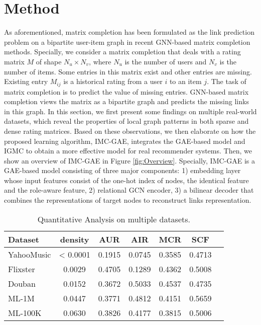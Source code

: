 \documentclass[sigconf]{acmart}
\begin{document}
\section{Method}
As aforementioned, matrix completion has been formulated as the link prediction problem on a bipartite user-item graph in recent GNN-based matrix completion methods. 
Specially, we consider a matrix completion that deals with a rating matrix $M$ of shape $N_u \times N_v$, where $N_u$ is the number of users and $N_v$ is the number of items. Some entries in this matrix exist and other entries are missing. Existing entry $M_{ij}$ is a historical rating from a user $i$ to an item $j$. 
The task of matrix completion is to predict the value of missing entries. 
GNN-based matrix completion views the matrix as a bipartite graph and predicts the missing links in this graph.
In this section, we first present some findings on multiple real-world datasets, which reveal the properties of local graph patterns in both sparse and dense rating matrices. 
Based on these observations, we then elaborate on how the proposed learning algorithm, IMC-GAE, integrates the GAE-based model and IGMC to obtain a more effective model for real recommender systems. Then, we show an overview of IMC-GAE in Figure \ref{fig:Overview}. Specially, IMC-GAE is a GAE-based model consisting of three major components:  1) embedding layer whose input features consist of the one-hot index of nodes, the identical feature and the role-aware feature, 2) relational GCN encoder, 3) a bilinear decoder that combines the representations of target nodes to reconstruct links representation. 
\begin{table}
  \caption{Quantitative Analysis on multiple datasets.}
  \label{tab:QAD}
  \begin{tabular}{lcccccc}
    \toprule
    \textbf{Dataset} & \textbf{density} &\textbf{AUR}&\textbf{AIR}&\textbf{MCR}&\textbf{SCF} \\
    \midrule
    YahooMusic & < 0.0001 & 0.1915 & 0.0745 & 0.3585 & 0.4713\\
    Flixster & 0.0029 & 0.4705 & 0.1289 & 0.4362 & 0.5008\\
    Douban & 0.0152 & 0.3672 & 0.5033 & 0.4537 &  0.4735\\
    ML-1M & 0.0447 & 0.3771 & 0.4812 & 0.4151 &  0.5659\\
    ML-100K & 0.0630 & 0.3826 & 0.4177 & 0.3815 & 0.5006\\
  \bottomrule
\end{tabular}
\end{table}
\end{document}
